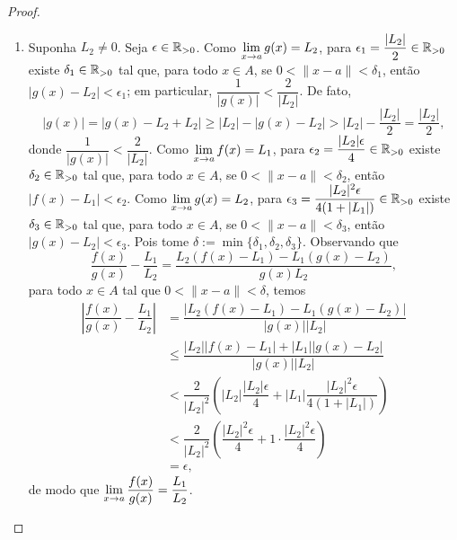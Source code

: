 \begin{proof}
\begin{enumerate}[leftmargin=*, align=left, label=\textbf{(\alph*)}]
                \begin{align*}
                    |f(x) g(x) - L_1 L_2|
                        &\leq |f(x)| |g(x) - L_2| + |L_2| |f(x) - L_1| \\
                        &< (1+|L_1|) \dfrac{\epsilon}{2(1+|L_1|)} + |L_2| \dfrac{\epsilon}{2(1+|L_2|)} \\
                        &< \dfrac{\epsilon}{2} + 1 \cdot \dfrac{\epsilon}{2} \\
                        &= \epsilon,
                \end{align*}
            de modo que $\ds \lim_{x \to a} f(x)g(x) = L_1 L_2$. \blackproof
            \item Suponha $L_2 \neq 0$. Seja $\epsilon \in \mathbb{R}_{>0}$. Como $\displaystyle \lim_{x \to a} g(x) = L_2$, para $\displaystyle \epsilon_1 = \dfrac{|L_2|}{2} \in \mathbb{R}_{>0}$ existe $\delta_1 \in \mathbb{R}_{>0}$ tal que, para todo $x \in A$, se $0<\|x-a\|<\delta_1$, então $|g(x) - L_2| < \epsilon_1$; em particular, $\dfrac{1}{|g(x)|} < \dfrac{2}{|L_2|}$. De fato,
                \[
                    |g(x)| = |g(x) - L_2 + L_2| \geq |L_2| - |g(x) - L_2| > |L_2| - \dfrac{|L_2|}{2} = \dfrac{|L_2|}{2},
                \]
            donde $\dfrac{1}{|g(x)|} < \dfrac{2}{|L_2|}$. Como $\displaystyle \lim_{x \to a} f(x) = L_1$, para $\displaystyle \epsilon_2 = \dfrac{|L_2| \epsilon}{4} \in \mathbb{R}_{>0}$ existe $\delta_2 \in \mathbb{R}_{>0}$ tal que, para todo $x \in A$, se $0<\|x-a\|<\delta_2$, então $|f(x) - L_1| < \epsilon_2$. Como $\displaystyle \lim_{x \to a} g(x) = L_2$, para $\displaystyle \epsilon_3 = \dfrac{|L_2|^2 \epsilon}{4(1 + |L_1|)} \in \mathbb{R}_{>0}$ existe $\delta_3 \in \mathbb{R}_{>0}$ tal que, para todo $x \in A$, se $0<\|x-a\|<\delta_3$, então $|g(x) - L_2| < \epsilon_3$. Pois tome $\delta := \min \{\delta_1, \delta_2, \delta_3 \}$. Observando que
                \[
                    \dfrac{f(x)}{g(x)} - \dfrac{L_1}{L_2} = \dfrac{L_2(f(x) - L_1) - L_1(g(x) - L_2)}{g(x)L_2},
                \]
            para todo $x \in A$ tal que $0 < \|x-a\| < \delta$, temos
                \begin{align*}
                    \left| \dfrac{f(x)}{g(x)} - \dfrac{L_1}{L_2} \right|
                        &= \dfrac{|L_2(f(x) - L_1) - L_1(g(x) - L_2)|}{|g(x)| |L_2|} \\
                        &\leq \dfrac{|L_2| |f(x) - L_1| + |L_1| |g(x) - L_2|}{|g(x)| |L_2|} \\
                        &< \dfrac{2}{|L_2|^2} \left( |L_2| \dfrac{|L_2| \epsilon}{4} + |L_1| \dfrac{|L_2|^2 \epsilon}{4(1 + |L_1|)} \right) \\
                        &< \dfrac{2}{|L_2|^2} \left( \dfrac{|L_2|^2 \epsilon}{4} + 1 \cdot \dfrac{|L_2|^2 \epsilon}{4} \right) \\
                        &= \epsilon,
                \end{align*}
            de modo que $\displaystyle \lim_{x \to a} \dfrac{f(x)}{g(x)} = \dfrac{L_1}{L_2}$. \blackproof
        \end{enumerate}
\end{proof}

